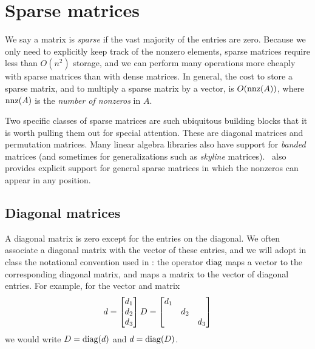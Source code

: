 \section{Sparse matrices}

We say a matrix is {\em sparse} if the vast majority of the entries are
zero.  Because we only need to explicitly keep track of the nonzero
elements, sparse matrices require less than $O(n^2)$ storage, and we
can perform many operations more cheaply with sparse matrices than with
dense matrices.  In general, the cost to store a sparse matrix, and to
multiply a sparse matrix by a vector, is $O(\operatorname{nnz}(A))$, where $\operatorname{nnz}(A)$
is the {\em number of nonzeros} in $A$.

Two specific classes of sparse matrices are such ubiquitous building
blocks that it is worth pulling them out for special attention.
These are diagonal matrices and permutation matrices.  Many linear
algebra libraries also have support for {\em banded} matrices
(and sometimes for generalizations such as {\em skyline} matrices).
\matlab\ also provides explicit support for general sparse matrices
in which the nonzeros can appear in any position.

\subsection{Diagonal matrices}

A diagonal matrix is zero except for the entries on the diagonal.
We often associate a diagonal matrix with the vector of these entries,
and we will adopt in class the notational convention used in \matlab:
the operator $\operatorname{diag}$ maps a vector to the corresponding diagonal matrix,
and maps a matrix to the vector of diagonal entries.  For example,
for the vector and matrix
\[
  d = \begin{bmatrix} d_1 \\ d_2 \\ d_3 \end{bmatrix} \\
  D = \begin{bmatrix} d_1 & & \\ & d_2 & \\ & & d_3 \end{bmatrix}
\]
we would write $D = \operatorname{diag}(d)$ and $d = \operatorname{diag}(D)$.

